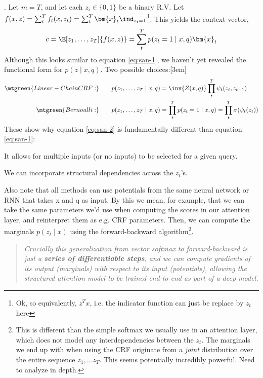 \documentclass[11pt]{article}
\renewcommand\vec[2][]{\bm{#2}_{#1}}
\newcommand\myspace[1][]{\vspace{#1\bigskipamount}}
\newcommand\p{\Needspace{10\baselineskip} \noindent}
\begin{document}
\myspace 
\p {}. Let $m = T$, and let each $z_i \in \{0, 1\}$ be a binary R.V. Let $f(x, z) = \sum_{t}^{T} f_t(x, z_t) = \sum_t^T \vec[t]{x} \ind_{z_t=1}$\footnote{Ok, so equivalently, $z^T x$, i.e. the indicator function can just be replace by $z_t$ here}. This yields the context vector,
\begin{align}
	c = \E[z_1, \ldots, z_T]{f(x, z)} = \sum_t^T p(z_t = 1 \mid x, q) \vec[t]{x} \label{eq:san-2}
\end{align}
Although this looks similar to equation \ref{eq:san-1}, we haven't yet revealed the functional form for $p(z \mid x, q)$. Two possible choices:[3em]
\begin{align}
\mtgreen{Linear-Chain CRF:}&\qquad p(z_1, \ldots, z_T\mid x, q) = \inv{Z(x, q)} \prod_t^T \psi_t(z_t, z_{t-1}) \\
\mtgreen{Bernoulli:}&\qquad p(z_1,\ldots, z_T \mid x, q) = \prod_t^T p(z_t = 1 \mid x, q) = \prod_t^T \sigma(\psi_t(z_t))
\end{align}
These show why equation \ref{eq:san-2} is fundamentally different than equation \ref{eq:san-1}:
\begin{compactitem}
	\item It allows for multiple inputs (or no inputs) to be selected for a given query.
	\item We can incorporate structural dependencies across the $z_t$'s. 
\end{compactitem}
Also note that all methods can use potentials from the same neural network or RNN that takes x and q as input. By this we mean, for example, that we can take the same parameters we'd use when computing the scores in our attention layer, and reinterpret them as e.g. CRF parameters. Then, we can compute the marginals $p(z_t \mid x)$ using the forward-backward algorithm\footnote{This is different than the simple softmax we usually use in an attention layer, which does not model any interdependencies between the $z_t$. The marginals we end up with when using the CRF originate from a \textit{joint} distribution over the entire sequence $z_1, \ldots z_T$. This seems potentially incredibly powerful. Need to analyze in depth.}.
\vspace{-0.5em}
\begin{quote}
	{\small\itshape Crucially this generalization from vector softmax to forward-backward is just a \textbf{series of differentiable steps}, and we can compute gradients of its output (marginals) with respect to its input (potentials), allowing the structured attention model to be trained end-to-end as part of a deep model.
	}
\end{quote}
\end{document}
